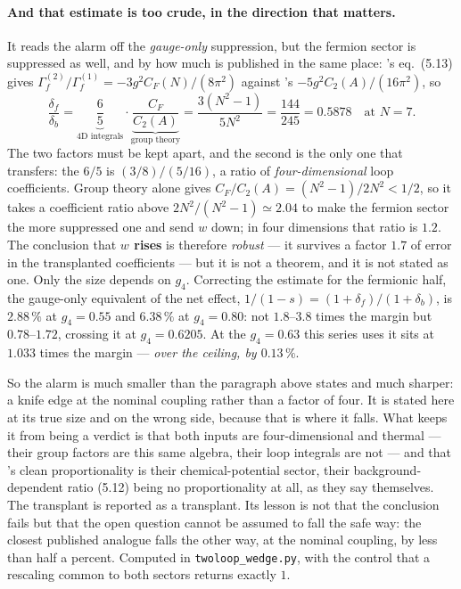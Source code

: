 \documentclass[11pt,a4paper]{article}
\begin{document}
\paragraph{And that estimate is too crude, in the direction that matters.} It reads the alarm off
the \emph{gauge-only} suppression, but the fermion sector is suppressed as well, and by how much is
published in the same place: \cite{GuoDu}'s eq.~(5.13) gives
$\Gamma^{(2)}_f/\Gamma^{(1)}_f=-3g^2C_F(N)/(8\pi^2)$ against \cite{DGKA}'s
$-5g^2C_2(A)/(16\pi^2)$, so
\[
  \frac{\delta_f}{\delta_b}=\underbrace{\frac{6}{5}}_{\text{4D integrals}}\cdot
  \underbrace{\frac{C_F}{C_2(A)}}_{\text{group theory}}
  =\frac{3(N^2-1)}{5N^2}=\frac{144}{245}=0.5878 \quad\text{at } N=7 .
\]
The two factors must be kept apart, and the second is the only one that transfers: the $6/5$ is
$(3/8)\big/(5/16)$, a ratio of \emph{four-dimensional} loop coefficients. Group theory alone gives
$C_F/C_2(A)=(N^2-1)/2N^2<1/2$, so it takes a coefficient ratio above $2N^2/(N^2-1)\simeq2.04$ to
make the fermion sector the more suppressed one and send $w$ down; in four dimensions that ratio is
$1.2$. The conclusion that \textbf{$w$ rises} is therefore \emph{robust} --- it survives a factor
$1.7$ of error in the transplanted coefficients --- but it is not a theorem, and it is not stated as
one. Only the size depends on $g_4$. Correcting the estimate for the fermionic half, the gauge-only
equivalent of the net effect, $1/(1-s)=(1+\delta_f)/(1+\delta_b)$, is $2.88\,\%$ at $g_4=0.55$ and
$6.38\,\%$ at $g_4=0.80$: not $1.8$--$3.8$ times the margin but $0.78$--$1.72$, crossing it at
$g_4=0.6205$. At the $g_4=0.63$ this series uses it sits at $1.033$ times the margin ---
\emph{over the ceiling, by $0.13\,\%$}.

So the alarm is much smaller than the paragraph above states and much sharper: a knife edge at the
nominal coupling rather than a factor of four. It is stated here at its true size and on the wrong
side, because that is where it falls. What keeps it from being a verdict is that both inputs are
four-dimensional and thermal --- their group factors are this same algebra, their loop integrals are
not --- and that \cite{GuoDu}'s clean proportionality is their chemical-potential sector, their
background-dependent ratio (5.12) being no proportionality at all, as they say themselves. The
transplant is reported as a transplant. Its lesson is not that the conclusion fails but that the
open question cannot be assumed to fall the safe way: the closest published analogue falls the other
way, at the nominal coupling, by less than half a percent. Computed in
\texttt{twoloop\_wedge.py}, with the control that a rescaling common to both sectors returns exactly
$1$.
\end{document}
